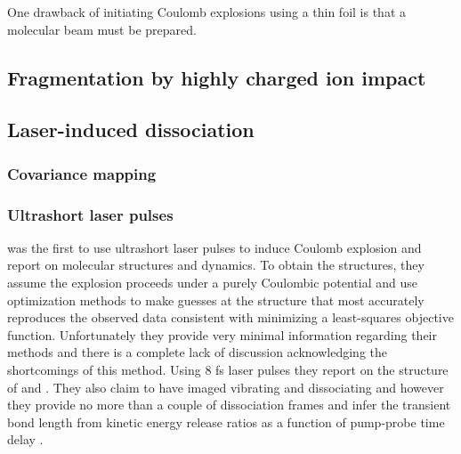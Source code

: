 
One drawback of initiating Coulomb explosions using a thin foil is that a molecular beam must be prepared.

\subsection{Fragmentation by highly charged ion impact}

\subsection{Laser-induced dissociation}
\subsubsection{Covariance mapping}
\subsubsection{Ultrashort laser pulses}
\citet{Legare05structure,Legare05dynamics} was the first to use ultrashort laser pulses to induce Coulomb explosion and report on molecular structures and dynamics. To obtain the structures, they assume the explosion proceeds under a purely Coulombic potential and use optimization methods to make guesses at the structure that most accurately reproduces the observed data consistent with minimizing a least-squares objective function. Unfortunately they provide very minimal information regarding their methods and there is a complete lack of discussion acknowledging the shortcomings of this method\footnotemark. Using 8 fs laser pulses they report on the structure of  and  \citep{Legare05structure}. They also claim to have imaged vibrating  and dissociating  and  however they provide no more than a couple of dissociation frames and infer the transient  bond length from kinetic energy release ratios as a function of pump-probe time delay \citep{Legare05dynamics}.


